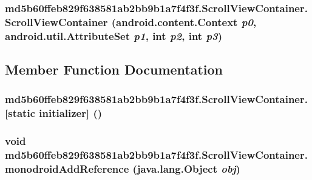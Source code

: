 \hypertarget{classmd5b60ffeb829f638581ab2bb9b1a7f4f3f_1_1_scroll_view_container_2ec1c5ba20e2c2ddccb8e2c650187f32}{
\subsubsection[{ScrollViewContainer}]{\setlength{\rightskip}{0pt plus 5cm}md5b60ffeb829f638581ab2bb9b1a7f4f3f.ScrollViewContainer.ScrollViewContainer (android.content.Context {\em p0}, \/  android.util.AttributeSet {\em p1}, \/  int {\em p2}, \/  int {\em p3})}}
\label{classmd5b60ffeb829f638581ab2bb9b1a7f4f3f_1_1_scroll_view_container_2ec1c5ba20e2c2ddccb8e2c650187f32}




\subsection{Member Function Documentation}
\hypertarget{classmd5b60ffeb829f638581ab2bb9b1a7f4f3f_1_1_scroll_view_container_e6f237a05cfe451622d7e03806a130ba}{
\subsubsection[{[static initializer]}]{\setlength{\rightskip}{0pt plus 5cm}md5b60ffeb829f638581ab2bb9b1a7f4f3f.ScrollViewContainer.\mbox{[}static initializer\mbox{]} ()}}
\label{classmd5b60ffeb829f638581ab2bb9b1a7f4f3f_1_1_scroll_view_container_e6f237a05cfe451622d7e03806a130ba}


\hypertarget{classmd5b60ffeb829f638581ab2bb9b1a7f4f3f_1_1_scroll_view_container_36cffa5f672764a8803bbd2b7aada5a0}{
\subsubsection[{monodroidAddReference}]{\setlength{\rightskip}{0pt plus 5cm}void md5b60ffeb829f638581ab2bb9b1a7f4f3f.ScrollViewContainer.monodroidAddReference (java.lang.Object {\em obj})}}
\label{classmd5b60ffeb829f638581ab2bb9b1a7f4f3f_1_1_scroll_view_container_36cffa5f672764a8803bbd2b7aada5a0}


